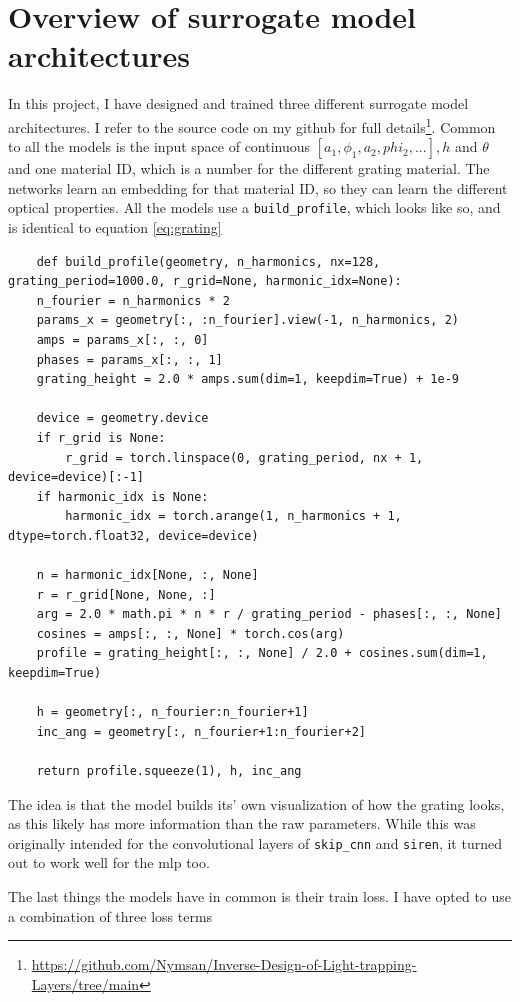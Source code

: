 \section{Overview of surrogate model architectures}
In this project, I have designed and trained three different surrogate model architectures. I refer to the source code on my github for full details\footnote{\url{https://github.com/Nymsan/Inverse-Design-of-Light-trapping-Layers/tree/main}}.
Common to all the models is the input space of continuous $[a_1,\phi_1,a_2,phi_2,...],h$ and $\theta$ and one material ID, which is a number for the different grating material. The networks learn an embedding for that material ID, so they can learn the different optical properties.
All the models use a \texttt{build\_profile}, which looks like so, and is identical to equation \ref{eq:grating}
\begin{lstlisting}
    def build_profile(geometry, n_harmonics, nx=128, grating_period=1000.0, r_grid=None, harmonic_idx=None):
    n_fourier = n_harmonics * 2
    params_x = geometry[:, :n_fourier].view(-1, n_harmonics, 2)
    amps = params_x[:, :, 0]
    phases = params_x[:, :, 1]
    grating_height = 2.0 * amps.sum(dim=1, keepdim=True) + 1e-9

    device = geometry.device
    if r_grid is None:
        r_grid = torch.linspace(0, grating_period, nx + 1, device=device)[:-1]
    if harmonic_idx is None:
        harmonic_idx = torch.arange(1, n_harmonics + 1, dtype=torch.float32, device=device)

    n = harmonic_idx[None, :, None]
    r = r_grid[None, None, :]
    arg = 2.0 * math.pi * n * r / grating_period - phases[:, :, None]
    cosines = amps[:, :, None] * torch.cos(arg)
    profile = grating_height[:, :, None] / 2.0 + cosines.sum(dim=1, keepdim=True)
    
    h = geometry[:, n_fourier:n_fourier+1]
    inc_ang = geometry[:, n_fourier+1:n_fourier+2]

    return profile.squeeze(1), h, inc_ang
\end{lstlisting}

The idea is that the model builds its' own visualization of how the grating looks, as this likely has more information than the raw parameters. While this was originally intended for the convolutional layers of 
\texttt{skip\_cnn} and \texttt{siren}, it turned out to work well for the mlp too.

The last things the models have in common is their train loss. I have opted to use a combination of three loss terms

